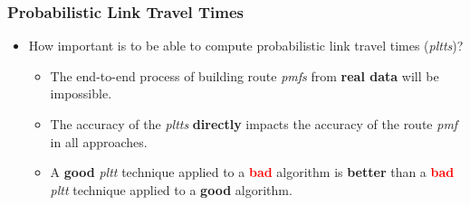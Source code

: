 \documentclass[t]{beamer}
\begin{document}
\begin{frame}
\begin{columns}
\end{columns}
\end{frame}

\begin{frame}\frametitle{Probabilistic Link Travel Times}
\begin{itemize}
\item How important is to be able to compute probabilistic link travel times (\emph{pltts})?
\begin{itemize}
\item<2-> The end-to-end process of building route \emph{pmfs} from \textbf{real data} will be impossible.
\item<3-> The accuracy of the \emph{pltts}  \textbf{directly} impacts the accuracy of the route \emph{pmf} in all approaches.
\item<4-> A \textcolor{mygreen}{\textbf{good}} \textit{pltt} technique applied to a \textcolor{red}{\textbf{bad}} algorithm is \textbf{better} than a \textcolor{red}{\textbf{bad}} \textit{pltt} technique applied to a \textcolor{mygreen}{\textbf{good}} algorithm.
\end{itemize}
\end{itemize}
\end{frame}
\end{document}
